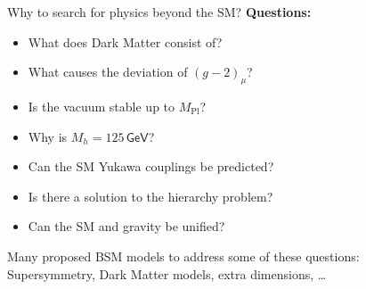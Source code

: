 \documentclass[hyperref={pdfpagelabels=false},ngerman]{beamer}
\newcommand{\eh}[1]{\,\mathsf{#1}}
\renewcommand{\emph}{\textbf}
\begin{document}
\begin{frame}{Why to search for physics beyond the SM?}
  \emph{Questions:}
  \begin{itemize}
  \item What does Dark Matter consist of?
  \item What causes the deviation of $(g-2)_\mu$?
  \item Is the vacuum stable up to $M_{\text{Pl}}$?
  \item Why is $M_h = 125\eh{GeV}$?
  \item Can the SM Yukawa couplings be predicted?
  \item Is there a solution to the hierarchy problem?
  \item Can the SM and gravity be unified?
  \end{itemize}
  \vspace{1em}
  Many proposed BSM models to address some of these questions:\\
  Supersymmetry, Dark Matter models, extra dimensions, \ldots
\end{frame}
\end{document}

